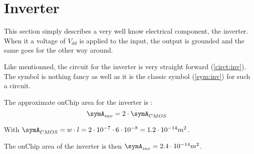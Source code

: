 \section{Inverter}
\label{sec:inv}

This section simply describes a very well know electrical component, the inverter. When it a voltage of $V_{dd}$ is applied to the input, the output is grounded and the same goes for the other way around.

\begin{figure}[H]
  \centering
  \hspace*{2.5cm}
  \hfill
  \hspace*{1.5cm}
  \caption{}
  \label{fig:inv}
\end{figure}

Like mentionned, the circuit for the inverter is very straight forward (\cref{circt:inv}). The symbol is nothing fancy as well as it is the classic symbol (\cref{sym:inv}) for such a circuit.

The approximate onChip area for the inverter is :
\begin{equation}
  \symA_{inv}=2\cdot \symA_{CMOS}
\end{equation}

With $\symA_{CMOS}= w\cdot l=2\cdot 10^{-7}\cdot6\cdot10^{-8} =1.2\cdot10^{-14}m^2$.

The onChip area of the inverter is then $\symA_{inv}=2.4\cdot10^{-14}m^2$.
